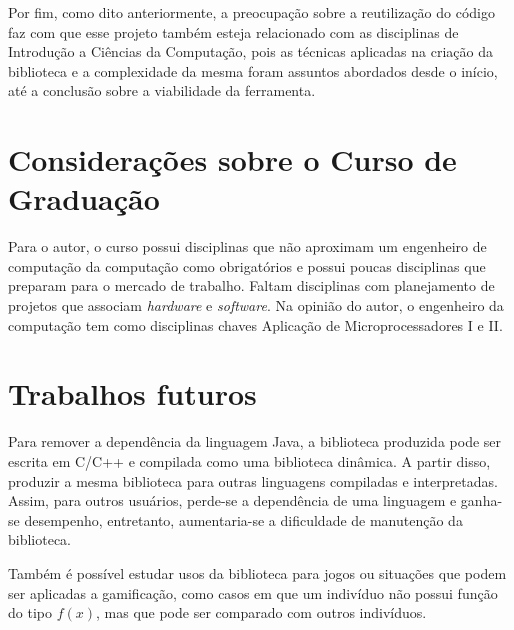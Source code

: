 Por fim, como dito anteriormente, a preocupação sobre a reutilização do código faz com que esse projeto também esteja relacionado com as disciplinas de Introdução a Ciências da Computação, pois as técnicas aplicadas na criação da biblioteca e a complexidade da mesma foram assuntos abordados desde o início, até a conclusão sobre a viabilidade da ferramenta.

\section{Considerações sobre o Curso de Graduação}

Para o autor, o curso possui disciplinas que não aproximam um engenheiro de computação da computação como obrigatórios e possui poucas disciplinas que preparam para o mercado de trabalho. Faltam disciplinas com planejamento de projetos que associam \textit{hardware} e \textit{software}. Na opinião do autor, o engenheiro da computação tem como disciplinas chaves Aplicação de Microprocessadores I e II.

\section{Trabalhos futuros}

Para remover a dependência da linguagem Java, a biblioteca produzida pode ser escrita em C/C++ e compilada como uma biblioteca dinâmica. A partir disso, produzir a mesma biblioteca para outras linguagens compiladas e interpretadas. Assim, para outros usuários, perde-se a dependência de uma linguagem e ganha-se desempenho, entretanto, aumentaria-se a dificuldade de manutenção da biblioteca.

Também é possível estudar usos da biblioteca para jogos ou situações que podem ser aplicadas a gamificação, como casos em que um indivíduo não possui função \fitness do tipo $f(x)$, mas que pode ser comparado com outros indivíduos.